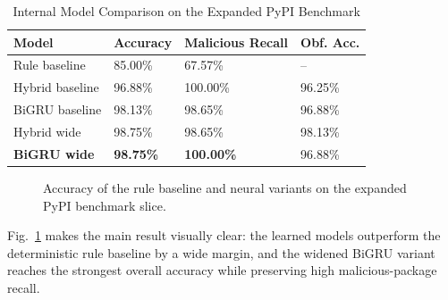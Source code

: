 \documentclass[conference]{IEEEtran}
\begin{document}
\begin{table}[htbp]
\caption{Internal Model Comparison on the Expanded PyPI Benchmark}
\label{tab:internal_results}
\centering
\renewcommand{\arraystretch}{1.2}
\begin{tabular}{p{2.3cm}p{1.25cm}p{1.35cm}p{1.2cm}}
\toprule
\textbf{Model} & \textbf{Accuracy} & \textbf{Malicious Recall} & \textbf{Obf. Acc.} \\
\midrule
Rule baseline & 85.00\% & 67.57\% & -- \\
Hybrid baseline & 96.88\% & 100.00\% & 96.25\% \\
BiGRU baseline & 98.13\% & 98.65\% & 96.88\% \\
Hybrid wide & 98.75\% & 98.65\% & 98.13\% \\
\textbf{BiGRU wide} & \textbf{98.75\%} & \textbf{100.00\%} & 96.88\% \\
\bottomrule
\end{tabular}
\end{table}

\begin{figure}[htbp]
\centering
{}
\caption{Accuracy of the rule baseline and neural variants on the expanded PyPI benchmark slice.}
\label{fig:accuracy_chart}
\end{figure}

Fig.~\ref{fig:accuracy_chart} makes the main result visually clear: the learned models outperform the deterministic rule baseline by a wide margin, and the widened BiGRU variant reaches the strongest overall accuracy while preserving high malicious-package recall.
\end{document}
